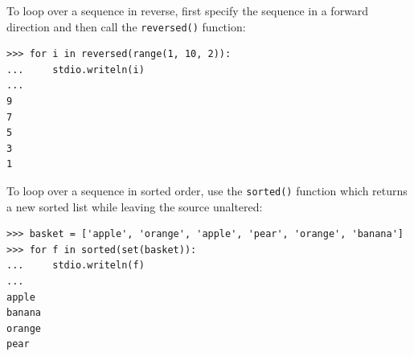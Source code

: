 \documentclass[8pt,a4paper,compress,handout]{beamer}
\begin{document}
\begin{frame}[fragile]
To loop over a sequence in reverse, first specify the sequence in a forward direction and then call the \lstinline{reversed()} function:
\begin{lstlisting}[language={}]
>>> for i in reversed(range(1, 10, 2)):
...     stdio.writeln(i)
...
9
7
5
3
1
\end{lstlisting}

\bigskip

To loop over a sequence in sorted order, use the \lstinline{sorted()} function which returns a new sorted list while leaving the source unaltered:
\begin{lstlisting}[language={}]
>>> basket = ['apple', 'orange', 'apple', 'pear', 'orange', 'banana']
>>> for f in sorted(set(basket)):
...     stdio.writeln(f)
...
apple
banana
orange
pear
\end{lstlisting}
\end{frame}
\end{document}
